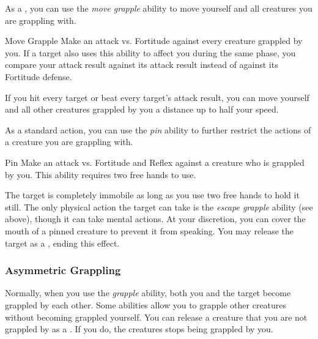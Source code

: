              As a , you can use the \textit{move grapple} ability to move yourself and all creatures you are grappling with.

            \begin{freeability}{Move Grapple}
                Make an attack vs. Fortitude against every creature grappled by you.
                If a target also uses this ability to affect you during the same phase, you compare your attack result against its attack result instead of against its Fortitude defense.

                If you hit every target or beat every target's attack result, you can move yourself and all other creatures grappled by you a distance up to half your speed.
            \end{freeability}

            \label{Pin} As a standard action, you can use the \textit{pin} ability to further restrict the actions of a creature you are grappling with.

            \begin{freeability}{Pin}
                Make an attack vs. Fortitude and Reflex against a creature who is grappled by you.
                This ability requires two free hands to use.

                \hit The target is completely immobile as long as you use two free hands to hold it still.
                The only physical action the target can take is the \textit{escape grapple} ability (see above), though it can take mental actions.
                At your discretion, you can cover the mouth of a pinned creature to prevent it from speaking.
                You may release the target as a , ending this effect.
            \end{freeability}

        \subsubsection{Asymmetric Grappling}\label{Asymmetric Grappling}
            Normally, when you use the \textit{grapple} ability, both you and the target become grappled by each other.
            Some abilities allow you to grapple other creatures without becoming grappled yourself.
            You can release a creature that you are not grappled by as a .
            If you do, the creatures stops being grappled by you.

